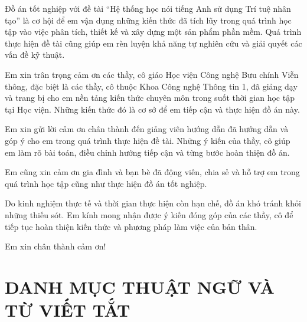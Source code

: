 \documentclass[12pt,a4paper,oneside]{report}
\begin{document}
Đồ án tốt nghiệp với đề tài ``Hệ thống học nói tiếng Anh sử dụng Trí tuệ nhân tạo'' là cơ hội để em vận dụng những kiến thức đã tích lũy trong quá trình học tập vào việc phân tích, thiết kế và xây dựng một sản phẩm phần mềm. Quá trình thực hiện đề tài cũng giúp em rèn luyện khả năng tự nghiên cứu và giải quyết các vấn đề kỹ thuật.

Em xin trân trọng cảm ơn các thầy, cô giáo Học viện Công nghệ Bưu chính Viễn thông, đặc biệt là các thầy, cô thuộc Khoa Công nghệ Thông tin 1, đã giảng dạy và trang bị cho em nền tảng kiến thức chuyên môn trong suốt thời gian học tập tại Học viện. Những kiến thức đó là cơ sở để em tiếp cận và thực hiện đồ án này.

Em xin gửi lời cảm ơn chân thành đến giảng viên hướng dẫn đã hướng dẫn và góp ý cho em trong quá trình thực hiện đề tài. Những ý kiến của thầy, cô giúp em làm rõ bài toán, điều chỉnh hướng tiếp cận và từng bước hoàn thiện đồ án.

Em cũng xin cảm ơn gia đình và bạn bè đã động viên, chia sẻ và hỗ trợ em trong quá trình học tập cũng như thực hiện đồ án tốt nghiệp.

Do kinh nghiệm thực tế và thời gian thực hiện còn hạn chế, đồ án khó tránh khỏi những thiếu sót. Em kính mong nhận được ý kiến đóng góp của các thầy, cô để tiếp tục hoàn thiện kiến thức và phương pháp làm việc của bản thân.

Em xin chân thành cảm ơn!



\chapter*{DANH MỤC THUẬT NGỮ VÀ TỪ VIẾT TẮT}
\end{document}
